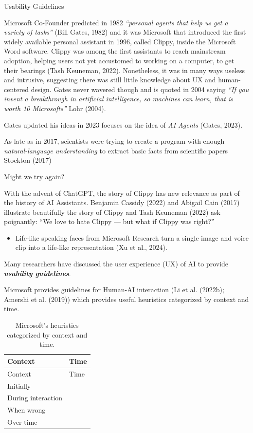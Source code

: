 \documentclass[
  letterpaper,
  DIV=11,
  numbers=noendperiod]{scrartcl}
\providecommand{\tightlist}{%
  \setlength{\itemsep}{0pt}\setlength{\parskip}{0pt}}\usepackage{longtable,booktabs,array}
\begin{document}
Usability Guidelines

Microsoft Co-Founder predicted in 1982 \emph{``personal agents that help
us get a variety of tasks''} (Bill Gates, 1982) and it was Microsoft
that introduced the first widely available personal assistant in 1996,
called Clippy, inside the Microsoft Word software. Clippy was among the
first assistants to reach mainstream adoption, helping users not yet
accustomed to working on a computer, to get their bearings (Tash
Keuneman, 2022). Nonetheless, it was in many ways useless and intrusive,
suggesting there was still little knowledge about UX and human-centered
design. Gates never wavered though and is quoted in 2004 saying
\emph{``If you invent a breakthrough in artificial intelligence, so
machines can learn, that is worth 10 Microsofts''} Lohr (2004).

Gates updated his ideas in 2023 focuses on the idea of \emph{AI Agents}
(Gates, 2023).

As late as in 2017, scientists were trying to create a program with
enough \emph{natural-language understanding} to extract basic facts from
scientific papers Stockton (2017)

Might we try again?

With the advent of ChatGPT, the story of Clippy has new relevance as
part of the history of AI Assistants. Benjamin Cassidy (2022) and
Abigail Cain (2017) illustrate beautifully the story of Clippy and Tash
Keuneman (2022) ask poignantly: ``We love to hate Clippy --- but what if
Clippy was right?''

\begin{itemize}
\tightlist
\item
  Life-like speaking faces from Microsoft Research turn a single image
  and voice clip into a life-like representation (Xu et al., 2024).
\end{itemize}

Many researchers have discussed the user experience (UX) of AI to
provide \textbf{\emph{usability guidelines}}.

Microsoft provides guidelines for Human-AI interaction (Li et al.
(2022b); Amershi et al. (2019)) which provides useful heuristics
categorized by context and time.

\begin{longtable}[]{@{}ll@{}}
\caption{Microsoft's heuristics categorized by context and
time.}\tabularnewline
\toprule\noalign{}
Context & Time \\
\midrule\noalign{}
\endfirsthead
\toprule\noalign{}
Context & Time \\
\midrule\noalign{}
\endhead
\bottomrule\noalign{}
\endlastfoot
Initially & \\
During interaction & \\
When wrong & \\
Over time & \\
\end{longtable}
\end{document}
